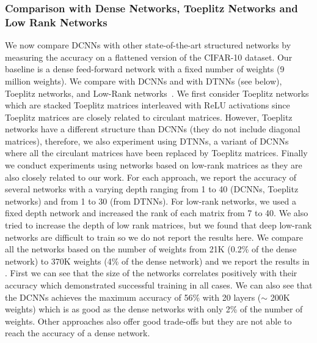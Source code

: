 \subsubsection{Comparison with Dense Networks, Toeplitz Networks and Low Rank Networks}

We now compare DCNNs with other state-of-the-art structured networks by measuring the accuracy on a flattened version of the CIFAR-10 dataset.
Our baseline is a dense feed-forward network with a fixed number of weights (9 million weights).
We compare with DCNNs and with DTNNs (see below), Toeplitz networks, and Low-Rank networks~\cite{yu2017compressing}.
We first consider Toeplitz networks which are stacked Toeplitz matrices interleaved with ReLU activations since Toeplitz matrices are closely related to circulant matrices.
However, Toeplitz networks have a different structure than DCNNs (they do not include diagonal matrices), therefore, we also experiment using DTNNs, a variant of DCNNs where all the circulant matrices have been replaced by Toeplitz matrices.
Finally we conduct experiments using networks based on low-rank matrices as they are also closely related to our work.
For each approach, we report the accuracy of several networks with a varying depth ranging from 1 to 40 (DCNNs, Toeplitz networks) and from 1 to 30 (from DTNNs).
For low-rank networks, we used a fixed depth network and increased the rank of each matrix from 7 to 40.
We also tried to increase the depth of low rank matrices, but we found that deep low-rank networks are difficult to train so we do not report the results here.
We compare all the networks based on the number of weights from 21K (0.2\% of the dense network) to 370K weights (4\% of the dense network) and we report the results in . 
First we can see that the size of the networks correlates positively with their accuracy which demonstrated successful training in all cases.
We can also see that the DCNNs achieves the maximum accuracy of 56\% with 20 layers ($\sim$ 200K weights) which is as good as the dense networks with only 2\% of the number of weights.
Other approaches also offer good trade-offs but they are not able to reach the accuracy of a dense network.




